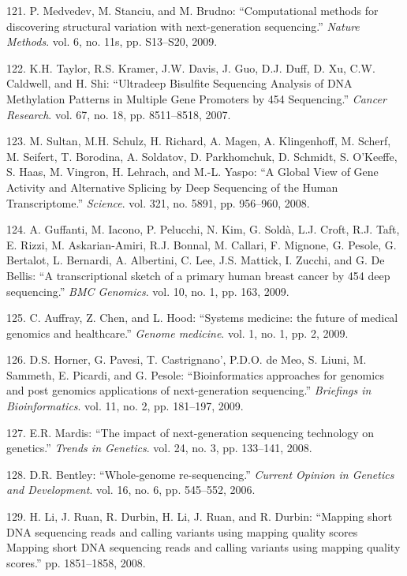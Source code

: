 \documentclass[12pt,a4paper,twoside]{ugathesis}
\theoremstyle{definition}
\theoremstyle{definition}
\theoremstyle{definition}
\theoremstyle{remark}
\begin{document}
\hypertarget{ref-Medvedev2009}{}
121. P. Medvedev, M. Stanciu, and M. Brudno: ``Computational methods for
discovering structural variation with next-generation sequencing.''
\emph{Nature Methods}. vol. 6, no. 11s, pp. S13--S20, 2009.

\hypertarget{ref-Taylor2007}{}
122. K.H. Taylor, R.S. Kramer, J.W. Davis, J. Guo, D.J. Duff, D. Xu,
C.W. Caldwell, and H. Shi: ``Ultradeep Bisulfite Sequencing Analysis of
DNA Methylation Patterns in Multiple Gene Promoters by 454 Sequencing.''
\emph{Cancer Research}. vol. 67, no. 18, pp. 8511--8518, 2007.

\hypertarget{ref-Sultan2008}{}
123. M. Sultan, M.H. Schulz, H. Richard, A. Magen, A. Klingenhoff, M.
Scherf, M. Seifert, T. Borodina, A. Soldatov, D. Parkhomchuk, D.
Schmidt, S. O'Keeffe, S. Haas, M. Vingron, H. Lehrach, and M.-L. Yaspo:
``A Global View of Gene Activity and Alternative Splicing by Deep
Sequencing of the Human Transcriptome.'' \emph{Science}. vol. 321, no.
5891, pp. 956--960, 2008.

\hypertarget{ref-Guffanti2009}{}
124. A. Guffanti, M. Iacono, P. Pelucchi, N. Kim, G. Soldà, L.J. Croft,
R.J. Taft, E. Rizzi, M. Askarian-Amiri, R.J. Bonnal, M. Callari, F.
Mignone, G. Pesole, G. Bertalot, L. Bernardi, A. Albertini, C. Lee, J.S.
Mattick, I. Zucchi, and G. De Bellis: ``A transcriptional sketch of a
primary human breast cancer by 454 deep sequencing.'' \emph{BMC
Genomics}. vol. 10, no. 1, pp. 163, 2009.

\hypertarget{ref-Auffray2009}{}
125. C. Auffray, Z. Chen, and L. Hood: ``Systems medicine: the future of
medical genomics and healthcare.'' \emph{Genome medicine}. vol. 1, no.
1, pp. 2, 2009.

\hypertarget{ref-Horner2009}{}
126. D.S. Horner, G. Pavesi, T. Castrignano', P.D.O. de Meo, S. Liuni,
M. Sammeth, E. Picardi, and G. Pesole: ``Bioinformatics approaches for
genomics and post genomics applications of next-generation sequencing.''
\emph{Briefings in Bioinformatics}. vol. 11, no. 2, pp. 181--197, 2009.

\hypertarget{ref-Mardis2008}{}
127. E.R. Mardis: ``The impact of next-generation sequencing technology
on genetics.'' \emph{Trends in Genetics}. vol. 24, no. 3, pp. 133--141,
2008.

\hypertarget{ref-Bentley2006}{}
128. D.R. Bentley: ``Whole-genome re-sequencing.'' \emph{Current Opinion
in Genetics and Development}. vol. 16, no. 6, pp. 545--552, 2006.

\hypertarget{ref-Li2008}{}
129. H. Li, J. Ruan, R. Durbin, H. Li, J. Ruan, and R. Durbin: ``Mapping
short DNA sequencing reads and calling variants using mapping quality
scores Mapping short DNA sequencing reads and calling variants using
mapping quality scores.'' pp. 1851--1858, 2008.
\end{document}
